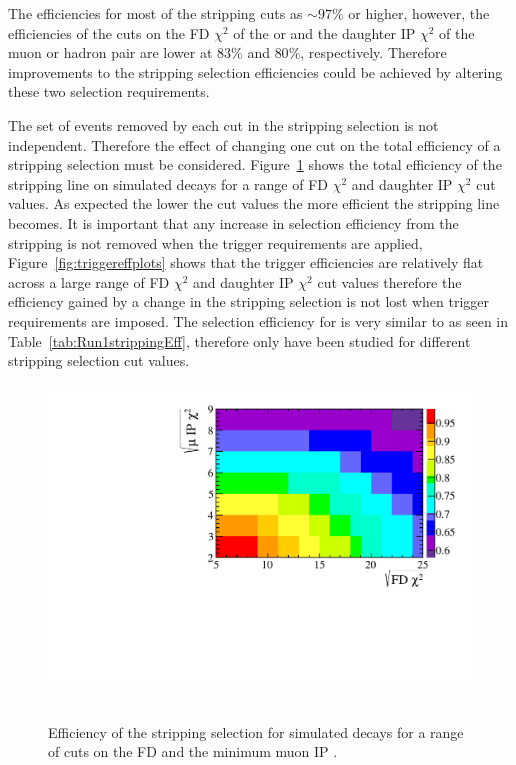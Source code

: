 The efficiencies for most of the stripping cuts as $\sim 97 \%$ or higher, however, the efficiencies of the cuts on the FD $\chi^{2}$ of the \bsd or \jpsi and the daughter IP $\chi^{2}$ of the muon or hadron pair are lower at $83 \%$ and $80 \%$, respectively. Therefore improvements to the stripping selection efficiencies could be achieved by altering these two selection requirements. 



The set of events removed by each cut in the stripping selection is not independent. Therefore the effect of changing one cut on the total efficiency of a stripping selection must be considered. Figure~\ref{fig:efficiencyplots} shows the total efficiency of the \bsmumu stripping line on simulated \bsmumu decays for a range of FD $\chi^{2}$ and daughter IP $\chi^{2}$ cut values. As expected the lower the cut values the more efficient the stripping line becomes. It is important that any increase in \bsmumu selection efficiency from the stripping is not removed when the trigger requirements are applied, Figure~\ref{fig:triggereffplots} shows that the trigger efficiencies are relatively flat across a large range of FD $\chi^{2}$ and daughter IP $\chi^{2}$ cut values therefore the efficiency gained by a change in the stripping selection is not lost when trigger requirements are imposed. The selection efficiency for \bdmumu is very similar to \bsmumu as seen in Table~\ref{tab:Run1strippingEff}, therefore only \bsmumu have been studied for different stripping selection cut values. 


\begin{figure}
    \centering
        \includegraphics[width= 0.8 \textwidth]{./Figs/Selection/Bs2MuMu_efficiency_chart_Feb3.pdf}
    ~ %
    \caption{Efficiency of the \bmumu stripping selection for \bsmumu simulated decays for a range of cuts on the \bs FD \chisqd and the minimum muon IP \chisqd.}
    \label{fig:efficiencyplots}
\end{figure}

